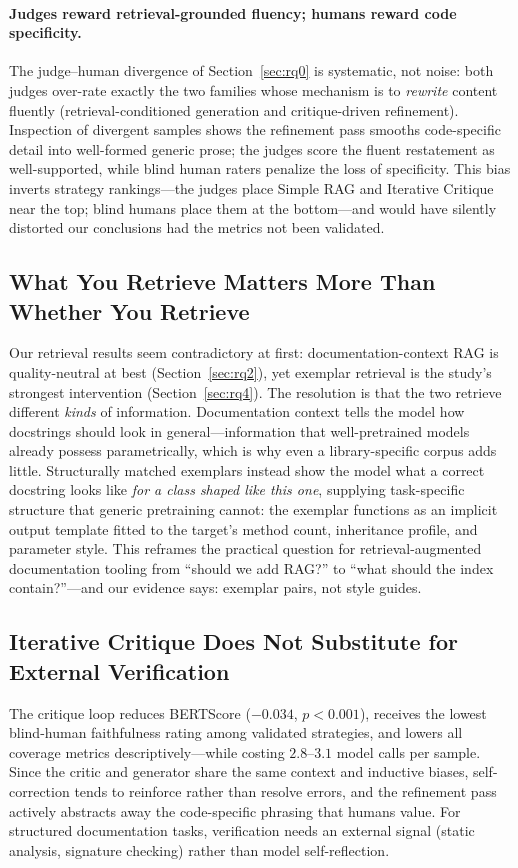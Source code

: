 \documentclass[pdflatex,sn-mathphys-ay]{sn-jnl}%
\theoremstyle{thmstyleone}%
\theoremstyle{thmstyletwo}%
\theoremstyle{thmstylethree}%
\begin{document}
{\paragraph{Judges reward retrieval-grounded fluency; humans reward code specificity.}
The judge--human divergence of Section~\ref{sec:rq0} is systematic, not noise: both judges over-rate exactly the two families whose mechanism is to \emph{rewrite} content fluently (retrieval-conditioned generation and critique-driven refinement). Inspection of divergent samples shows the refinement pass smooths code-specific detail into well-formed generic prose; the judges score the fluent restatement as well-supported, while blind human raters penalize the loss of specificity. This bias inverts strategy rankings---the judges place Simple RAG and Iterative Critique near the top; blind humans place them at the bottom---and would have silently distorted our conclusions had the metrics not been validated.

\subsection{What You Retrieve Matters More Than Whether You Retrieve}
Our retrieval results seem contradictory at first: documentation-context RAG is quality-neutral at best (Section~\ref{sec:rq2}), yet exemplar retrieval is the study's strongest intervention (Section~\ref{sec:rq4}). The resolution is that the two retrieve different \emph{kinds} of information. Documentation context tells the model how docstrings should look in general---information that well-pretrained models already possess parametrically, which is why even a library-specific corpus adds little. Structurally matched exemplars instead show the model what a correct docstring looks like \emph{for a class shaped like this one}, supplying task-specific structure that generic pretraining cannot: the exemplar functions as an implicit output template fitted to the target's method count, inheritance profile, and parameter style. This reframes the practical question for retrieval-augmented documentation tooling from ``should we add RAG?'' to ``what should the index contain?''---and our evidence says: exemplar pairs, not style guides.

\subsection{Iterative Critique Does Not Substitute for External Verification}
The critique loop reduces BERTScore ($-0.034$, $p<0.001$), receives the lowest blind-human faithfulness rating among validated strategies, and lowers all coverage metrics descriptively---while costing $2.8$--$3.1$ model calls per sample. Since the critic and generator share the same context and inductive biases, self-correction tends to reinforce rather than resolve errors, and the refinement pass actively abstracts away the code-specific phrasing that humans value. For structured documentation tasks, verification needs an external signal (static analysis, signature checking) rather than model self-reflection.

}
\end{document}
